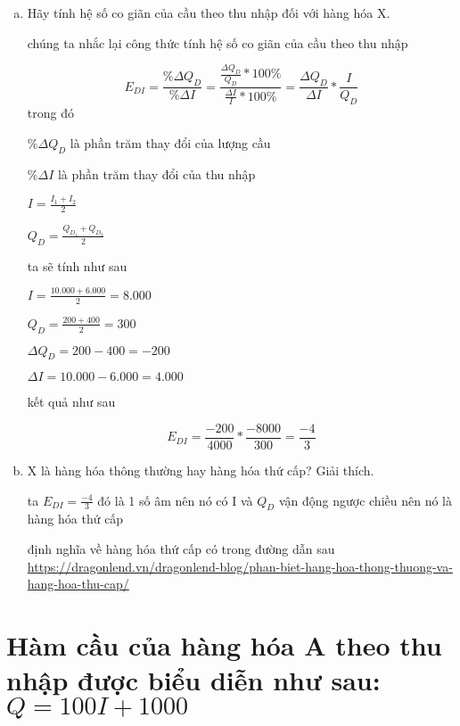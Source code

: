 \begin{enumerate}[a.]
  \item Hãy tính hệ số co giãn của cầu theo thu nhập đối với hàng hóa X.

        chúng ta nhắc lại công thức tính hệ số co giãn của cầu theo thu nhập

        \[ E_{DI} =
          \frac{\% \Delta Q_D}{\% \Delta I}
          = \frac{\frac{\Delta Q_D}{Q_D} * 100 \% }{\frac{\Delta I}{I} * 100 \% }
          = \frac{\Delta Q_D}{\Delta I} * \frac{I}{Q_D}
        \]
        trong đó

        $\% \Delta Q_D$ là phần trăm thay đổi của lượng cầu

        $\% \Delta I$ là phần trăm thay đổi của thu nhập

        $ I = \frac{I_1 + I_2}{2}$

        $ Q_D = \frac{Q_{D_1} + Q_{D_2}}{2}$


        ta sẽ tính như sau

        $ I = \frac{10.000 + 6.000}{2} = 8.000$

        $ Q_D = \frac{200 + 400}{2} = 300$

        $\Delta Q_D = 200 - 400 = -200$

        $\Delta I = 10.000 - 6.000 = 4.000$

        kết quả như sau

        \[ E_{DI} = \frac{-200}{4000} * \frac{-8000}{300} = \frac{-4}{3}  \]


  \item X là hàng hóa thông thường hay hàng hóa thứ cấp? Giải thích.

        ta $E_{DI} = \frac{-4}{3}$ đó là 1 số âm nên nó có I và $Q_D$ vận động ngược chiều
        nên nó là hàng hóa thứ cấp

        định nghĩa về hàng hóa thứ cấp có trong đường dẫn sau
        \url{https://dragonlend.vn/dragonlend-blog/phan-biet-hang-hoa-thong-thuong-va-hang-hoa-thu-cap/}

\end{enumerate}

\section{Hàm cầu của hàng hóa A theo thu nhập được biểu diễn như sau: $Q = 100I + 1000$ }

